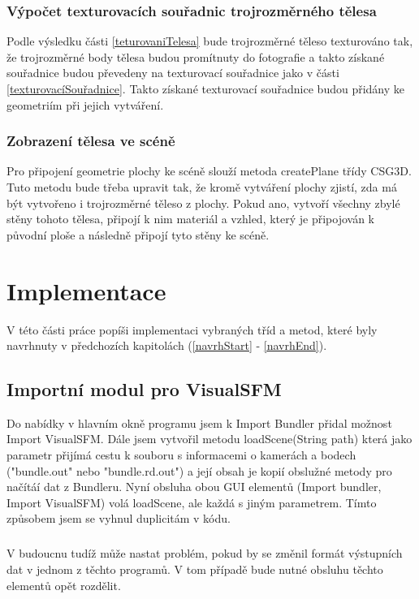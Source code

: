 \documentclass[11pt,twoside,a4paper]{book}
\begin{document}
\subsection{Výpočet texturovacích souřadnic trojrozměrného tělesa}
Podle výsledku části \ref{teturovaniTelesa} bude trojrozměrné těleso texturováno tak, že trojrozměrné body tělesa budou promítnuty do fotografie a takto získané souřadnice budou převedeny na texturovací souřadnice jako v části \ref{texturovacíSouřadnice}. Takto získané texturovací souřadnice budou přidány ke geometriím při jejich vytváření.

\subsection{Zobrazení tělesa ve scéně}
Pro připojení geometrie plochy ke scéně slouží metoda createPlane třídy CSG3D. Tuto metodu bude třeba upravit tak, že kromě vytváření plochy zjistí, zda má být vytvořeno i trojrozměrné těleso z plochy. Pokud ano, vytvoří všechny zbylé stěny tohoto tělesa, připojí k nim materiál a vzhled, který je připojován k původní ploše a následně připojí tyto stěny ke scéně.


%
%
%
\chapter{Implementace}
V této části práce popíši implementaci vybraných tříd a metod, které byly navrhnuty v předchozích kapitolách (\ref{navrhStart} - \ref{navrhEnd}).

\section{Importní modul pro VisualSFM}
Do nabídky v hlavním okně programu jsem k Import Bundler přidal možnost Import VisualSFM. Dále jsem vytvořil metodu loadScene(String path) která jako parametr přijímá cestu k souboru s informacemi o kamerách a bodech ("bundle.out" nebo "bundle.rd.out") a její obsah je kopií obslužné metody pro načítáí dat z Bundleru. Nyní obsluha obou GUI elementů (Import bundler, Import VisualSFM) volá loadScene, ale každá s jiným parametrem. Tímto způsobem jsem se vyhnul duplicitám v kódu. 
\paragraph{}
V budoucnu tudíž může nastat problém, pokud by se změnil formát výstupních dat v jednom z těchto programů. V tom případě bude nutné obsluhu těchto elementů opět rozdělit.
\end{document}
